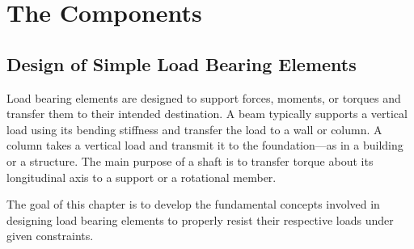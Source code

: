 \documentclass[
10pt,
a4paper,
openany,
svgnames,
]{book}
\begin{document}
\begin{exercises}
    \begin{figure}[H]
    \centering
  \end{figure}
  
\end{exercises}


\part{The Components}


\chapter{Design of Simple Load Bearing Elements}

Load bearing elements are designed to support forces, moments, or torques and transfer them to their intended destination. A beam typically supports a vertical load using its bending stiffness and transfer the load to a wall or column. A column takes a vertical load and transmit it to the foundation—as in a building or a structure. The main purpose of a shaft is to transfer torque about its longitudinal axis to a support or a rotational member.

The goal of this chapter is to develop the fundamental concepts involved in designing load bearing elements to properly resist their respective loads under given constraints.
\end{document}
